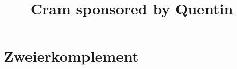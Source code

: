 \documentclass{article}
\title{Cram sponsored by Quentin}
\begin{document}
 
\maketitle 
\section{Zweierkomplement}

\\
\end{document}
